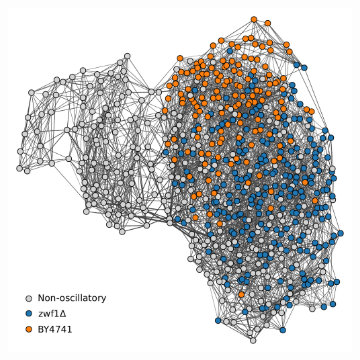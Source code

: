 \begin{figure}[htbp]
  \centering
  \begin{subfigure}[t]{0.5\textwidth}
  \centering
    \includegraphics[width=\linewidth]{graphclust_combined_is20016_edit1.pdf}
    \caption{
    }
    \label{fig:graphclustering-combined}
  \end{subfigure}



\end{figure}
